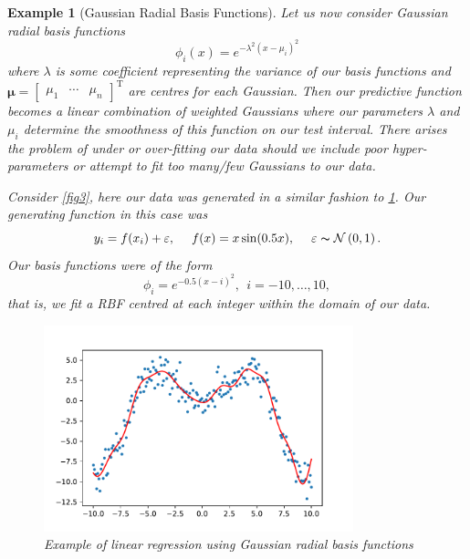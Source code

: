 \documentclass[10pt,a4paper]{article}
\numberwithin{equation}{section}
\theoremstyle{plain}
\theoremstyle{own}
\newtheorem{example}{Example}[section]
\begin{document}
\begin{example}[Gaussian Radial Basis Functions]
Let us now consider Gaussian radial basis functions
\begin{equation}
\phi_i(x) = e^{-\lambda^{2} ( x - \mu_i ) ^{2} }
\end{equation}
where $\lambda$ is some coefficient representing the variance of our basis functions and $\boldsymbol\mu = \left[ \begin{matrix} \mu_1 & \cdots & \mu_n \end{matrix} \right]^{\text{T}}$ are centres for each Gaussian. Then our predictive function becomes a linear combination of weighted Gaussians where our parameters $\lambda$ and $\mu_i$ determine the smoothness of this function on our test interval. There arises the problem of under or over-fitting our data should we include poor hyper-parameters or attempt to fit too many/few Gaussians to our data.

Consider \cref{fig3}, here our data was generated in a similar fashion to \cref{rbf}. Our generating function in this case was
\begin{equation}
y_i = f(x_i) + \varepsilon, ~~~~ f(x) = x \sin(0.5x), ~~~~ \varepsilon \thicksim \mathcal{N} \left( 0, 1 \right).
\end{equation}
Our basis functions were of the form
\begin{equation}
\phi_i = e^{-0.5 ( x - i ) ^{2} },~~ i = -10, \ldots, 10,
\end{equation}
that is, we fit a RBF centred at each integer within the domain of our data.
\begin{figure}[H]
\centering
\includegraphics[width = 0.8\textwidth]{f5}
\caption{Example of linear regression using Gaussian radial basis functions}
\label{rbf}
\end{figure}
\end{example}
\pagebreak
\end{document}
